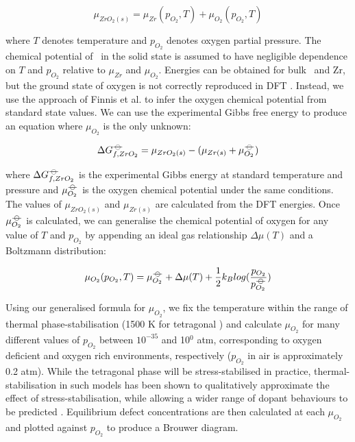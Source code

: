 \begin{equation}
{\mu}_{ZrO_2(s)} = {\mu}_{Zr}(p_{O_2}, T) + {\mu}_{O_2}(p_{O_2}, T)
\label{mewZrO2compmethodology}
\end{equation}

where $T$ denotes temperature and $p_{O_2}$ denotes oxygen partial pressure. The chemical potential of \zirconia\ in the solid state is assumed to have negligible dependence on $T$ and $p_{O_2}$ relative to ${\mu}_{Zr}$ and ${\mu}_{O_2}$. Energies can be obtained for bulk \zirconia\ and Zr, but the ground state of oxygen is not correctly reproduced in DFT \cite{Batyrev2000,Lozovoi2001}. Instead, we use the approach of Finnis et al. \cite{Finnis2005} to infer the oxygen chemical potential from standard state values. We can use the experimental Gibbs free energy to produce an equation where $\mu_{O_2}$ is the only unknown:

\begin{equation}
\Delta{G^{{\ensuremath{-\kern-4pt{\ominus}\kern-4pt-}}}_{f, ZrO_2}} = \mu_{ZrO_2(s)} - (\mu_{Zr(s)} + \mu^{{-\kern-4pt{\ominus}\kern-4pt-}}_{O_2})
\end{equation}

where $\Delta{G^{{\ensuremath{-\kern-4pt{\ominus}\kern-4pt-}}}_{f, ZrO_2}}$ is the experimental Gibbs energy at standard temperature and pressure and $\mu^{{-\kern-4pt{\ominus}\kern-4pt-}}_{O_2}$ is the oxygen chemical potential under the same conditions. The values of $\mu_{ZrO_2(s)}$ and $\mu_{Zr(s)}$ are calculated from the DFT energies. Once $\mu^{{-\kern-4pt{\ominus}\kern-4pt-}}_{O_2}$ is calculated, we can generalise the chemical potential of oxygen for any value of $T$ and $p_{O_2}$ by appending an ideal gas relationship $\Delta{\mu(T)}$ and a Boltzmann distribution:

\begin{equation}
\mu_{O_2}(p_{O_2},T) = \mu^{{-\kern-4pt{\ominus}\kern-4pt-}}_{O_2} + \Delta{\mu(T)} + \frac{1}{2}{k_B}log(\frac{p_{O_2}}{p^{{-\kern-4pt{\ominus}\kern-4pt-}}_{O_2}})
\end{equation}

Using our generalised formula for $\mu_{O_2}$, we fix the temperature within the range of thermal phase-stabilisation (1500 K for tetragonal \zirconia) and calculate $\mu_{O_2}$ for many different values of $p_{O_2}$ between $10^{-35}$ and 10$^{0}$ atm, corresponding to oxygen deficient and oxygen rich environments, respectively ($p_{O_2}$ in air is approximately 0.2 atm). While the tetragonal phase will be stress-stabilised in practice, thermal-stabilisation in such models has been shown to qualitatively approximate the effect of stress-stabilisation, while allowing a wider range of dopant behaviours to be predicted \cite{Bell2016}. Equilibrium defect concentrations are then calculated at each $\mu_{O_2}$ and plotted against $p_{O_2}$ to produce a Brouwer diagram. 

